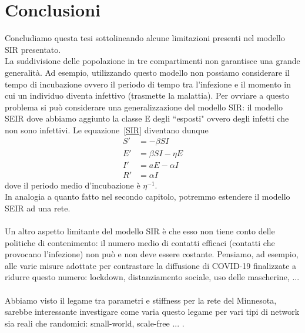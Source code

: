 \documentclass[12pt,a4paper,twoside]{report}
\begin{document}









\chapter*{Conclusioni}
Concludiamo questa tesi sottolineando alcune limitazioni presenti nel modello SIR presentato.\\
La suddivisione delle popolazione in tre compartimenti non garantisce una grande generalit\`a. Ad esempio, utilizzando questo modello non possiamo considerare il tempo di incubazione ovvero il periodo di tempo tra l'infezione e il momento in cui un individuo diventa infettivo (trasmette la malattia). Per ovviare a questo problema si pu\`o  considerare una generalizzazione del modello SIR: il modello  SEIR dove  abbiamo aggiunto la classe E degli ``esposti" ovvero degli infetti che  non sono infettivi. Le equazione~\eqref{SIR} diventano dunque 
\begin{equation*}
\begin{aligned}
S' &= -\beta S I \\
E' &= \beta S I  - \eta  E \\
I' &= aE - \alpha I \\
R' &=\alpha I 
\end{aligned}
\end{equation*}
dove il periodo medio d'incubazione \`e $\eta^{-1}$.\\
In analogia a quanto fatto nel secondo capitolo, potremmo estendere il modello SEIR ad una rete.\\
\\
Un altro aspetto limitante del modello SIR \`e che esso non tiene conto delle politiche di contenimento: il numero medio di contatti efficaci (contatti che provocano l'infezione) non pu\`o e non deve essere costante. Pensiamo, ad esempio, alle varie misure adottate per contrastare la diffusione di COVID-19 finalizzate a ridurre questo numero: lockdown, distanziamento sociale, uso delle mascherine, ...\\ \\
Abbiamo visto il legame tra parametri e stiffness per la rete del Minnesota, sarebbe interessante investigare come varia questo legame per vari tipi di network sia reali che randomici: small-world, scale-free ... .\\



\cleardoublepage
\listoffigures
{}
\listoftables
{}
\tableofcontents
\end{document}
